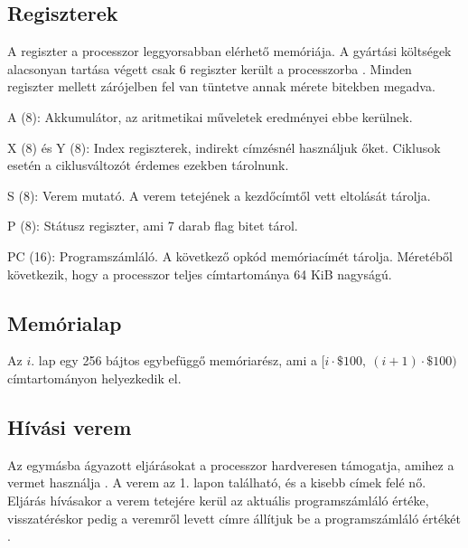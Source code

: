 \subsection{Regiszterek}
A regiszter a processzor leggyorsabban elérhető memóriája.
A gyártási költségek alacsonyan tartása végett csak 6 regiszter került a processzorba \cite{6502desc}.
Minden regiszter mellett zárójelben fel van tüntetve annak mérete bitekben megadva.

\begin{compactdesc}
	\item[A (8):] Akkumulátor, az aritmetikai műveletek eredményei ebbe kerülnek.
	\item[X (8) és Y (8):] 
	Index regiszterek, indirekt címzésnél használjuk őket.
	Ciklusok esetén a ciklusváltozót érdemes ezekben tárolnunk.
	\item[S (8):] 
	Verem mutató. A verem tetejének a kezdőcímtől vett eltolását tárolja.
	\item[P (8):]
	Státusz regiszter, ami 7 darab flag bitet tárol.
	\item[PC (16):]
	Programszámláló. 
	A következő opkód memóriacímét tárolja.
	Méretéből következik, hogy a processzor teljes címtartománya 64 KiB nagyságú.
\end{compactdesc}


\subsection{Memórialap}
Az $i$. lap egy 256 bájtos egybefüggő memóriarész, ami a $ [i \cdot \$100, \: (i+1) \cdot \$100) $ címtartományon helyezkedik el.

\subsection{Hívási verem}
Az egymásba ágyazott eljárásokat a processzor hardveresen támogatja, amihez a vermet használja \cite{6502desc}.
A verem az 1. lapon található, és a kisebb címek felé nő.
Eljárás hívásakor a verem tetejére kerül az aktuális programszámláló értéke, 
visszatéréskor pedig a veremről levett címre állítjuk be a programszámláló értékét \cite{6502instr}.

